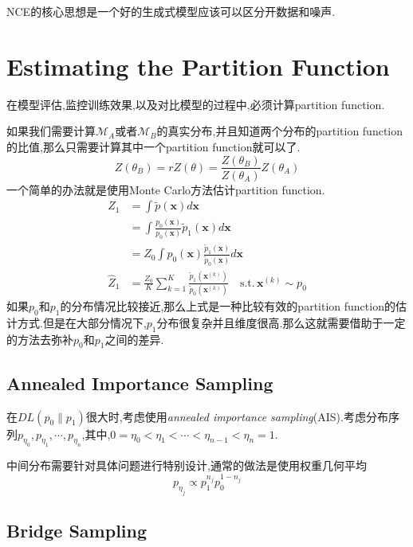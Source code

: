 NCE的核心思想是一个好的生成式模型应该可以区分开数据和噪声.

\section{Estimating the Partition Function}

在模型评估,监控训练效果,以及对比模型的过程中,必须计算partition function.

如果我们需要计算$\mathcal M_A$或者$\mathcal M_B$的真实分布,并且知道两个分布的partition function的比值,那么只需要计算其中一个partition function就可以了.
\begin{equation}
Z(\theta_B)=rZ(\theta)=\frac{Z(\theta_B)}{Z(\theta_A)}Z(\theta_A)
\end{equation}
一个简单的办法就是使用Monte Carlo方法估计partition function.
\begin{equation}\begin{split}
Z_1&=\int\tilde p(\mathbf x)d\mathbf x\\
&=\int\frac{p_0(\mathbf x)}{p_0(\mathbf x)}\tilde p_1(\mathbf x)d\mathbf x\\
&=Z_0\int p_0(\mathbf x)\frac{\tilde p_1(\mathbf x)}{\tilde p_0(\mathbf x)}d\mathbf x\\
\hat Z_1&=\frac{Z_0}{K}\sum_{k=1}^K\frac{\tilde p_1(\mathbf x^{(k)})}{\tilde p_0(\mathbf x^{(k)})}\quad\text{s.t.}\,\mathbf x^{(k)}\sim p_0
\end{split}\end{equation}
如果$p_0$和$p_1$的分布情况比较接近,那么上式是一种比较有效的partition function的估计方式.但是在大部分情况下,$p_1$分布很复杂并且维度很高.那么这就需要借助于一定的方法去弥补$p_0$和$p_1$之间的差异.

\subsection{Annealed Importance Sampling}

在$DL(p_0\|p_1)$很大时,考虑使用\textit{annealed importance sampling}(AIS).考虑分布序列$p_{\eta_0},p_{\eta_1},\cdots,p_{\eta_n}$,其中,$0=\eta_0<\eta_1<\cdots<\eta_{n-1}<\eta_n=1$.

中间分布需要针对具体问题进行特别设计,通常的做法是使用权重几何平均
\begin{equation}
p_{\eta_j}\propto p_1^{n_j}p_0^{1-n_j}
\end{equation}

\subsection{Bridge Sampling}

